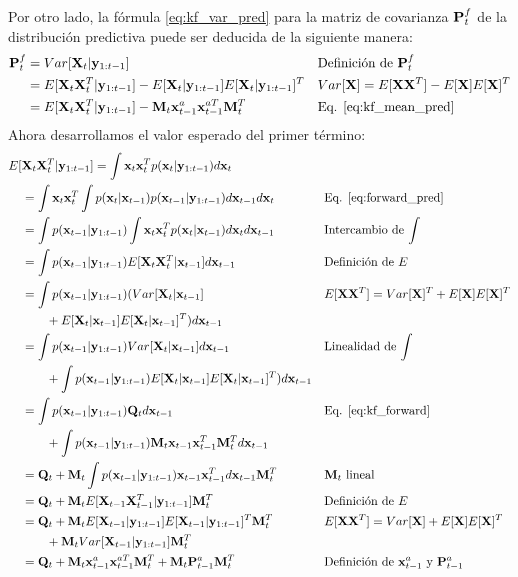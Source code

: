 Por otro lado, la fórmula \ref{eq:kf_var_pred} para la matriz de covarianza $\mathbf{P}_t^f$ de la distribución predictiva puede ser deducida de la siguiente manera:
\begin{align*}
    \mathbf{P}_t^f &= Var[\mathbf{X}_t | \mathbf{y}_{1:t-1}] && \text{Definición de $\mathbf{P}_t^f$}\\ 
    &= E[\mathbf{X}_t \mathbf{X}_t^T | \mathbf{y}_{1:t-1}] - E[\mathbf{X}_t | \mathbf{y}_{1:t-1}] E[\mathbf{X}_t | \mathbf{y}_{1:t-1}]^T && \text{$Var[\mathbf{X}] = E[\mathbf{X} \mathbf{X}^T] - E[\mathbf{X}]E[\mathbf{X}]^T$} \\
    &= E[\mathbf{X}_t \mathbf{X}_t^T | \mathbf{y}_{1:t-1}] - \mathbf{M}_t \mathbf{x}_{t-1}^a \mathbf{x}_{t-1}^{aT} \mathbf{M}_t^T && \text{Eq. \ref{eq:kf_mean_pred}}
\end{align*}
Ahora desarrollamos el valor esperado del primer término:
\begin{align*}
    E[&\mathbf{X}_t \mathbf{X}_t^T | \mathbf{y}_{1:t-1}] = \int \mathbf{x}_t \mathbf{x}_t^T p(\mathbf{x}_t | \mathbf{y}_{1:t-1}) d\mathbf{x}_t && \\
     &= \int \mathbf{x}_t \mathbf{x}_t^T \int p(\mathbf{x}_t | \mathbf{x}_{t-1}) p(\mathbf{x}_{t-1} | \mathbf{y}_{1:t-1}) d\mathbf{x}_{t-1} d\mathbf{x}_t && \text{Eq. \ref{eq:forward_pred}}\\
    &= \int p(\mathbf{x}_{t-1} | \mathbf{y}_{1:t-1}) \int \mathbf{x}_t \mathbf{x}_t^T p(\mathbf{x}_t | \mathbf{x}_{t-1}) d\mathbf{x}_t d\mathbf{x}_{t-1} && \text{Intercambio de $\int$}\\
    &= \int p(\mathbf{x}_{t-1} | \mathbf{y}_{1:t-1}) E[\mathbf{X}_t \mathbf{X}_t^T | \mathbf{x}_{t-1}] d\mathbf{x}_{t-1} && \text{Definición de $E$}\\
    &= \int p(\mathbf{x}_{t-1} | \mathbf{y}_{1:t-1}) (Var[\mathbf{X}_t | \mathbf{x}_{t-1}] && \text{$E[\mathbf{X} \mathbf{X}^T] = Var[\mathbf{X}]^T + E[\mathbf{X}]E[\mathbf{X}]^T$}\\
    &\hspace{2em} + E[\mathbf{X}_t | \mathbf{x}_{t-1}]E[\mathbf{X}_t | \mathbf{x}_{t-1}]^T) d\mathbf{x}_{t-1} && \\
    &= \int p(\mathbf{x}_{t-1} | \mathbf{y}_{1:t-1}) Var[\mathbf{X}_t | \mathbf{x}_{t-1}] d \mathbf{x}_{t-1} && \text{Linealidad de $\int$}\\
    &\hspace{2em} + \int p(\mathbf{x}_{t-1} | \mathbf{y}_{1:t-1}) E[\mathbf{X}_t | \mathbf{x}_{t-1}]E[\mathbf{X}_t | \mathbf{x}_{t-1}]^T) d\mathbf{x}_{t-1} && \\
    &= \int p(\mathbf{x}_{t-1} | \mathbf{y}_{1:t-1}) \mathbf{Q}_t d \mathbf{x}_{t-1} && \text{Eq. \ref{eq:kf_forward}}\\
    &\hspace{2em} + \int p(\mathbf{x}_{t-1} | \mathbf{y}_{1:t-1}) \mathbf{M}_t \mathbf{x}_{t-1} \mathbf{x}_{t-1}^T \mathbf{M}_t^T d\mathbf{x}_{t-1} \\
    &= \mathbf{Q}_t + \mathbf{M}_t \int p(\mathbf{x}_{t-1} | \mathbf{y}_{1:t-1}) \mathbf{x}_{t-1} \mathbf{x}_{t-1}^T d\mathbf{x}_{t-1} \mathbf{M}_t^T && \text{$\mathbf{M}_t$ lineal}\\
    &= \mathbf{Q}_t + \mathbf{M}_t E[\mathbf{X}_{t-1} \mathbf{X}_{t-1}^T | \mathbf{y}_{1:t-1}] \mathbf{M}_t^T && \text{Definición de $E$}\\
    &= \mathbf{Q}_t + \mathbf{M}_t E[\mathbf{X}_{t-1} | \mathbf{y}_{1:t-1}]E[\mathbf{X}_{t-1} | \mathbf{y}_{1:t-1}]^T \mathbf{M}_t^T && \text{$E[\mathbf{X} \mathbf{X}^T] = Var[\mathbf{X}] + E[\mathbf{X}]E[\mathbf{X}]^T$} \\
    &\hspace{2em} + \mathbf{M}_t Var[\mathbf{X}_{t-1} | \mathbf{y}_{1:t-1}] \mathbf{M}_t^T \\
    &= \mathbf{Q}_t + \mathbf{M}_t \mathbf{x}_{t-1}^a \mathbf{x}_{t-1}^{aT} \mathbf{M}_t^T + \mathbf{M}_t \mathbf{P}_{t-1}^a \mathbf{M}_t^T && \text{Definición de $\mathbf{x}_{t-1}^a$ y $\mathbf{P}_{t-1}^a$}\\
\end{align*}
